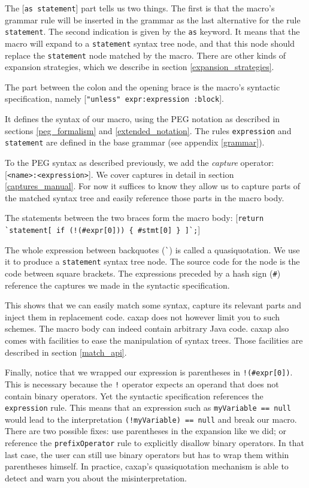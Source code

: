 The [\texttt{as statement}] part tells us two things. The first is that the
macro's grammar rule will be inserted in the grammar as the last alternative for
the rule \texttt{statement}. The second indication is given by the \texttt{as}
keyword. It means that the macro will expand to a \texttt{statement} syntax tree
node, and that this node should replace the \texttt{statement} node matched by
the macro. There are other kinds of expansion strategies, which we describe in
section \ref{expansion_strategies}.

The part between the colon and the opening brace is the macro's syntactic
specification, namely [\lstinline{"unless" expr:expression :block}].

It defines the syntax of our macro, using the PEG notation as described in
sections \ref{peg_formalism} and \ref{extended_notation}. The rules
\texttt{expression} and \texttt{statement} are defined in the base grammar (see
appendix \ref{grammar}).

To the PEG syntax as described previously, we add the \emph{capture} operator:
[\texttt{<name>:<expression>}]. We cover captures in detail in section
\ref{captures_manual}. For now it suffices to know they allow us to capture
parts of the matched syntax tree and easily reference those parts in the macro
body.

The statements between the two braces form the macro body:
[\lstinline|return `statement[ if (!(#expr[0])) { #stmt[0] } ]`;|]

The whole expression between backquotes (\texttt{\`{}}) is called a
quasiquotation. We use it to produce a \texttt{statement} syntax tree node. The
source code for the node is the code between square brackets. The expressions
preceded by a hash sign (\texttt{\#}) reference the captures we made in the
syntactic specification.

This shows that we can easily match some syntax, capture its relevant parts and
inject them in replacement code. caxap does not however limit you to such
schemes. The macro body can indeed contain arbitrary Java code. caxap also comes
with facilities to ease the manipulation of syntax trees. Those facilities are
described in section \ref{match_api}.

Finally, notice that we wrapped our expression is parentheses in
\lstinline{!(#expr[0])}. This is necessary because the \texttt{!} operator
expects an operand that does not contain binary operators. Yet the syntactic
specification references the \texttt{expression} rule. This means that an
expression such as \texttt{myVariable == null} would lead to the interpretation
\texttt{(!myVariable) == null} and break our macro. There are two possible
fixes: use parentheses in the expansion like we did; or reference the
\texttt{prefixOperator} rule to explicitly disallow binary operators. In that
last case, the user can still use binary operators but has to wrap them within
parentheses himself. In practice, caxap's quasiquotation mechanism is able to
detect and warn you about the misinterpretation.

